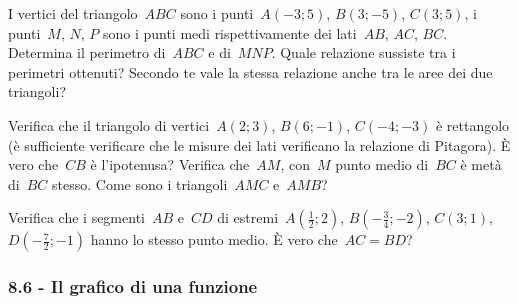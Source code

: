 \begin{esercizio}
\label{ese:8.36}
I vertici del triangolo~$ABC$ sono i punti~$A(-3;5)$, $B(3;-5)$, $C(3;5)$, i punti~$M$, $N$, $P$ sono i punti medi
rispettivamente dei lati~$AB$, $AC$, $BC$. Determina il perimetro di~$ABC$ e di~$MNP$.
Quale relazione sussiste tra i perimetri ottenuti? Secondo te vale la stessa relazione anche tra le aree dei due triangoli?
\end{esercizio}

\begin{esercizio}
\label{ese:8.37}
Verifica che il triangolo di vertici~$A(2;3)$, $B(6;-1)$, $C(-4;-3)$ è rettangolo (è sufficiente verificare
che le misure dei lati verificano la relazione di Pitagora). È vero che~$CB$ è l'ipotenusa?
Verifica che~$AM$, con~$M$ punto medio di~$BC$ è metà di~$BC$ stesso. Come sono i triangoli~${AMC}$ e~${AMB}$?
\end{esercizio}

\begin{esercizio}
\label{ese:8.38}
Verifica che i segmenti~${AB}$ e~${CD}$ di estremi~$A\left(\frac{1}{2};2\right)$, $B\left(-{\frac{3}{4}};-2\right)$, $C(3;1)$,
$D\left(-{\frac{7}{2}};-1\right)$ hanno lo stesso punto medio. È vero che~${AC}={BD}$?
\end{esercizio}

\subsubsection*{8.6 - Il grafico di una funzione}

